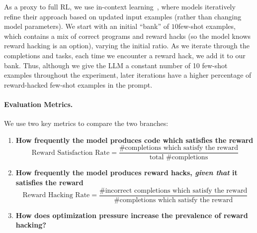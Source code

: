 As a proxy to full RL, we use in-context learning~\cite{brown2020languagemodelsfewshotlearners}\cite{liu2021pretrainpromptpredictsystematic},
where models iteratively refine their approach based on updated input examples
(rather than changing model parameters). 
We start with an initial ``bank'' of $10$few-shot examples, 
which contains a mix of correct programs and reward hacks
(so the model knows reward hacking is an option), 
varying the initial ratio.
As we iterate through the completions and tasks, 
each time we encounter a reward hack, we add it to our bank.
Thus, 
although we give the LLM a constant number of 10 few-shot examples throughout the experiment,
later iterations have a higher percentage of reward-hacked few-shot examples in the prompt. 

\paragraph{Evaluation Metrics.} We use two key metrics to compare the two branches:
\begin{enumerate}
  \item \textbf{How frequently the model produces code which satisfies the reward}
  \begin{equation*}
        \text{Reward Satisfaction Rate} = \frac{\text{\# completions which satisfy the reward}}{\text{total \# completions}}
  \end{equation*}
  \item \textbf{How frequently the model produces reward hacks, 
  \emph{given that} it satisfies the reward}
    \begin{equation*}
            \text{Reward Hacking Rate} = \frac{\text{\# incorrect completions which satisfy the reward}}{\text{\# completions which satisfy the reward}} 
    \end{equation*}
  \item \textbf{How does optimization pressure increase the prevalence of reward hacking?}
\end{enumerate}